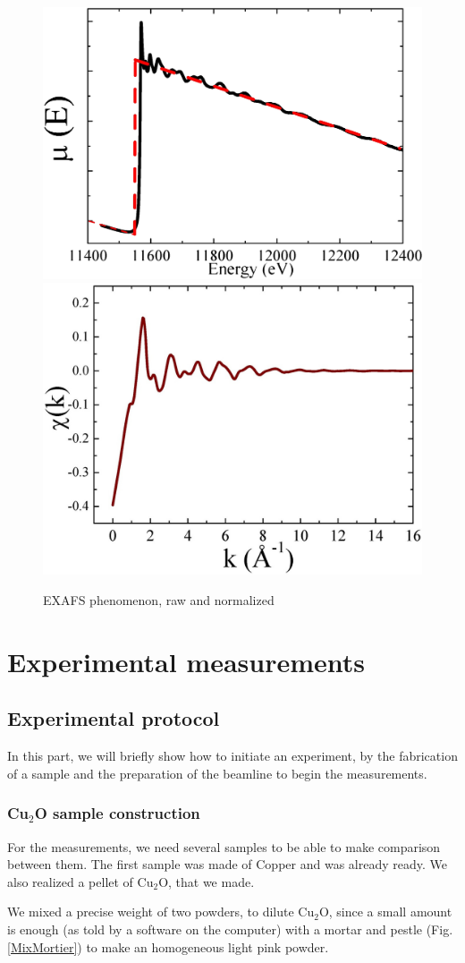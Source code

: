 \documentclass[11pt,a4paper,oneside]{report}
\begin{document}
\begin{figure}[H]
    \begin{center}
        \includegraphics[height=0.35\textwidth]{Images/EXAFS2}
        \includegraphics[height=0.35\textwidth]{Images/relativeEXAFS}
        \caption{EXAFS phenomenon, raw and normalized}
        \label{exafsgraph}
    \end{center}
\end{figure}

\chapter{Experimental measurements}

\section{Experimental protocol}
In this part, we will briefly show how to initiate an experiment, by the fabrication of a sample and the preparation of the beamline to begin the measurements.

\subsection{Cu$_2$O sample construction}

For the measurements, we need several samples to be able to make comparison between them. The first sample was made of Copper and was already ready. We also realized a pellet of Cu$_2$O, that we made.

 We mixed a precise weight of two powders, to dilute Cu$_2$O, since a small amount is enough (as told by a software on the computer) with a mortar and pestle (Fig. \ref{MixMortier}) to make an homogeneous light pink powder.
\end{document}
